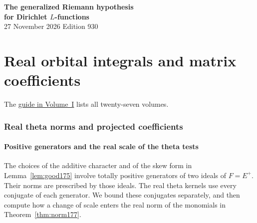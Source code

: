 \documentclass[a4paper,11pt]{article}
\theoremstyle{definition}
\theoremstyle{remark}
\numberwithin{equation}{section}
\begin{document}
\setcounter{part}{19}
\thispagestyle{plain}\begin{center}
{\LARGE\bfseries The generalized Riemann hypothesis\\[2pt]for Dirichlet \(L\)-functions}\\[6pt]
{\small 27 November 2026 \quad\textperiodcentered\quad Edition 930}\end{center}
\part{Real orbital integrals and matrix coefficients}\label{part:XX}
\begin{abstract}\noindent We estimate the archimedean factors in the orbital expansion. We compute matrix coefficients and height moments for the first-plane and higher-rank terms. For a rational flag with integral unmarked root ratios we bound the actual Bessel integral at its displaced archimedean frequency.\end{abstract}
\setcounter{section}{103}
\noindent The \hyperref[seriesguide]{guide in Volume~I} lists all twenty-seven volumes.
\begingroup\small\setlength{\parskip}{0pt}\tableofcontents\endgroup
\clearpage

\section{Real theta norms and projected coefficients}\label{nav:g-X-0}\label{nav:volume-XX}

\subsection{Positive generators and the real scale of the theta tests}\label{nav:VIII-08}
\label{sec:units179}

The choices of the additive character and of the skew form in
Lemma~\ref{lem:good175} involve totally positive generators of
two ideals of \(F=E^+\). Their norms are prescribed by those
ideals. The real theta kernels use every conjugate of each
generator. We bound these conjugates separately, and then
compute how a change of scale enters the real norm of the
monomials in Theorem~\ref{thm:norm177}.
\end{document}
